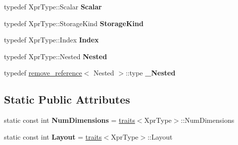 \begin{DoxyCompactItemize}
typedef Xpr\+Type\+::\+Scalar {\bfseries Scalar}
\item 
\mbox{\label{struct_eigen_1_1internal_1_1traits_3_01_tensor_custom_unary_op_3_01_custom_unary_func_00_01_xpr_type_01_4_01_4_ac7b976b445bffbe3fbbe2b2bea5cfd38}} 
typedef Xpr\+Type\+::\+Storage\+Kind {\bfseries Storage\+Kind}
\item 
\mbox{\label{struct_eigen_1_1internal_1_1traits_3_01_tensor_custom_unary_op_3_01_custom_unary_func_00_01_xpr_type_01_4_01_4_a370b75d43ad4b040967dc76e2b0c38ea}} 
typedef Xpr\+Type\+::\+Index {\bfseries Index}
\item 
\mbox{\label{struct_eigen_1_1internal_1_1traits_3_01_tensor_custom_unary_op_3_01_custom_unary_func_00_01_xpr_type_01_4_01_4_ae18f30be7d4180c41041c8f598be2bd3}} 
typedef Xpr\+Type\+::\+Nested {\bfseries Nested}
\item 
\mbox{\label{struct_eigen_1_1internal_1_1traits_3_01_tensor_custom_unary_op_3_01_custom_unary_func_00_01_xpr_type_01_4_01_4_a5dc98131ead0b8ceca9a46d61ee4d25d}} 
typedef \hyperlink{struct_eigen_1_1internal_1_1remove__reference}{remove\+\_\+reference}$<$ Nested $>$\+::type {\bfseries \+\_\+\+Nested}
\end{DoxyCompactItemize}
\subsection*{Static Public Attributes}
\begin{DoxyCompactItemize}
\item 
\mbox{\label{struct_eigen_1_1internal_1_1traits_3_01_tensor_custom_unary_op_3_01_custom_unary_func_00_01_xpr_type_01_4_01_4_a8ebffb76d802b8e3dd9d6eda13b506e2}} 
static const int {\bfseries Num\+Dimensions} = \hyperlink{struct_eigen_1_1internal_1_1traits}{traits}$<$Xpr\+Type$>$\+::Num\+Dimensions
\item 
\mbox{\label{struct_eigen_1_1internal_1_1traits_3_01_tensor_custom_unary_op_3_01_custom_unary_func_00_01_xpr_type_01_4_01_4_a23f1be26c5e90c87cffd16832505256a}} 
static const int {\bfseries Layout} = \hyperlink{struct_eigen_1_1internal_1_1traits}{traits}$<$Xpr\+Type$>$\+::Layout
\end{DoxyCompactItemize}


